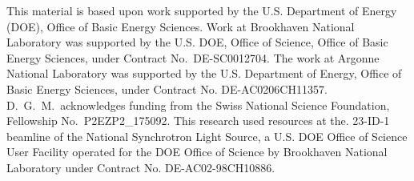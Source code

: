 \documentclass[aps,prl,showpacs,floatfix,twocolumn,superscriptaddress,longbibliography]{revtex4-1}
\begin{document}
\begin{acknowledgements}
This material is based upon work supported by the U.S. Department of Energy (DOE), Office of Basic Energy Sciences. Work at Brookhaven National Laboratory was supported by the U.S. DOE, Office of Science, Office of Basic Energy Sciences, under Contract No.~DE-SC0012704. The work at Argonne National Laboratory was supported by the U.S. Department of Energy, Office of Basic Energy Sciences, under Contract No. DE-AC0206CH11357.  D.~G.~M.\ acknowledges funding from the Swiss National Science Foundation, Fellowship No.\ P2EZP2\_175092. This research used resources at the. 23-ID-1 beamline of the National Synchrotron Light Source, a U.S. DOE Office of Science User Facility operated for the DOE Office of Science by Brookhaven National Laboratory under Contract No. DE-AC02-98CH10886.
\end{acknowledgements}


\end{document}
